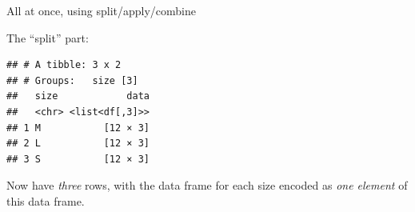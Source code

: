 \documentclass[ignorenonframetext,]{beamer}
\newenvironment{Shaded}{\begin{snugshade}}{\end{snugshade}}
\newcommand{\KeywordTok}[1]{\textcolor[rgb]{0.13,0.29,0.53}{\textbf{#1}}}
\newcommand{\NormalTok}[1]{#1}
\newcommand{\OperatorTok}[1]{\textcolor[rgb]{0.81,0.36,0.00}{\textbf{#1}}}
\newcommand{\StringTok}[1]{\textcolor[rgb]{0.31,0.60,0.02}{#1}}
\begin{document}
\begin{frame}[fragile]{All at once, using split/apply/combine}
\protect\hypertarget{all-at-once-using-splitapplycombine}{}

The ``split'' part:

\begin{Shaded}
\end{Shaded}

\begin{verbatim}
## # A tibble: 3 x 2
## # Groups:   size [3]
##   size            data
##   <chr> <list<df[,3]>>
## 1 M           [12 × 3]
## 2 L           [12 × 3]
## 3 S           [12 × 3]
\end{verbatim}

Now have \emph{three} rows, with the data frame for each size encoded as
\emph{one element} of this data frame.

\end{frame}
\end{document}

